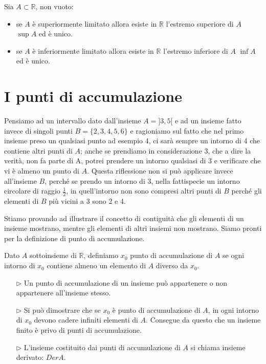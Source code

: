 Sia \(A\subset\mathbb{R}\), non vuoto:
\begin{itemize}
  \item se \(A\) è superiormente limitato allora esiste in \(\mathbb{R}\) 
l'estremo superiore di \(A\) \(\sup{A}\) ed è unico.
  \item se \(A\) è inferiormente limitato allora esiste in \(\mathbb{R}\) 
l'estremo inferiore di \(A\) \(\inf{A}\) ed è unico.
\end{itemize}

\section{I punti di accumulazione}
Pensiamo ad un intervallo dato dall'insieme \(A=]3, 5[\) e ad un insieme 
fatto 
invece di singoli punti \(B=\{2,3,4,5,6\}\) e ragioniamo sul fatto che nel 
primo insieme preso un qualsiasi punto ad esempio 4, ci sarà sempre un 
intorno di 4 che contiene altri punti di \(A\); anche se prendiamo in 
considerazione 3, che a dire la verità, non fa parte di A, potrei prendere un 
intorno qualsiasi di 3 e verificare che vi è almeno un punto di \(A\). Questa 
riflessione non si può applicare invece all'insieme \(B\), perché se prendo 
un intorno di 3, nella fattispecie un intorno circolare di raggio 
\(\frac{1}{2}\), 
in quell'intorno non sono compresi altri punti di \(B\) perché gli elementi 
di \(B\) più vicini a 3 sono 2 e 4.

Stiamo provando ad illustrare il concetto di contiguità che gli elementi di 
un insieme mostrano, mentre gli elementi di altri insiemi non mostrano. Siamo 
pronti per la definizione di punto di accumulazione.

\begin{definizione}
  Dato \(A\) sottoinsieme di \(\mathbb{R}\), definiamo \(x_0\) punto di 
accumulazione di \(A\) se ogni intorno di \(x_0\) contiene almeno un elemento di 
\(A\) diverso da \(x_0\).
\begin{itemize}
  \item[\(\rhd\)] Un punto di accumulazione di un insieme può appartenere 
o non appartenere all'insieme stesso.
  \item[\(\rhd\)]   Si può dimostrare che se \(x_0\) è punto di 
accumulazione di \(A\), in ogni intorno di \(x_0\) devono cadere infiniti 
elementi di \(A\). Consegue da questo che un insieme finito è privo di punti di 
accumulazione.
  \item[\(\rhd\)] L'insieme costituito dai punti di accumulazione di \(A\) 
si chiama insieme derivato: \(Der A\).
\end{itemize}
\end{definizione}

